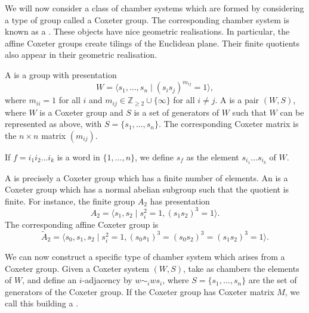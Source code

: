 \documentclass[11pt]{article}
\begin{document}
We will now consider a class of chamber systems which are formed by considering a type of group called a Coxeter group. The corresponding chamber system is known as a . These objects have nice geometric realisations. In particular, the affine Coxeter groups create tilings of the Euclidean plane. Their finite quotients also appear in their geometric realisation. 

\begin{definition}
    A  is a group with presentation
    \[W=\langle s_1,\hdots , s_n \mid (s_is_j)^{m_{ij}}=1\rangle,\]
    where $m_{ii}=1$ for all $i$ and $m_{ij}\in \mathbb{Z}_{\geq 2}\cup\{\infty\}$ for all $i\neq j$. 
    A  is a pair $(W,S)$, where $W$ is a Coxeter group and $S$ is a set of generators of $W$ such that $W$ can be represented as above, with $S=\{s_1,\hdots,s_n\}$. The corresponding Coxeter matrix is the $n\times n$ matrix $(m_{ij})$. 
\end{definition}


\begin{definition}
    If $f=i_1i_2\hdots  i_k$ is a word in $\{1,\hdots ,n\}$, we define $s_f$ as the element $s_{i_1}\hdots  s_{i_k}$ of $W$.
\end{definition}

A  is precisely a Coxeter group which has a finite number of elements. An  is a Coxeter group which has a normal abelian subgroup such that the quotient is finite. For instance, the finite group $A_2$ has presentation
\[A_2=\langle s_1,s_2\mid s_i^2=1, (s_1s_2)^3=1\rangle.\]
The corresponding affine Coxeter group is
\[\tilde{A}_2=\langle s_0,s_1,s_2\mid s_i^2=1, (s_0s_1)^3=(s_0s_2)^3=(s_1s_2)^3=1\rangle.\]


We can now construct a specific type of chamber system which arises from a Coxeter group. Given a Coxeter system $(W,S)$, take as chambers the elements of $W$, and define an $i$-adjacency by $w\sim_iws_i$, where $S=\{s_1,\hdots  ,s_n\}$ are the set of generators of the Coxeter group. If the Coxeter group has Coxeter matrix $M$, we call this building a .
\end{document}
